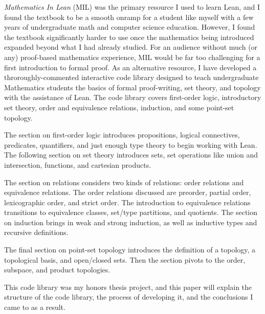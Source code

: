 \textit{Mathematics In Lean} (MIL) was the primary resource I used 
to learn Lean, and I found the textbook to be a smooth
onramp for a student like myself with a few years of undergraduate
math and computer science education. However, I found the textbook
significantly harder to use once the mathematics being introduced 
expanded beyond what I had already studied. For an audience without
much (or any) proof-based mathematics experience, MIL would be 
far too challenging for a first introduction to formal proof.
As an alternative resource, I have developed a throroughly-commented
interactive code library designed to teach undergraduate Mathematics
students the basics of formal proof-writing, set theory, and topology 
with the assistance of Lean. The code library covers first-order logic,
introductory set theory, order and equivalence relations, induction, and
some point-set topology. 

The section on first-order logic introduces propositions, 
logical connectives, predicates, quantifiers, and just enough
type theory to begin working with Lean. The following section on
set theory introduces sets, set operations like union and intersection,
functions, and cartesian products.

The section on relations considers two kinds of relations:
order relations and equivalence relations. The order relations
discussed are preorder, partial order, lexicographic order, and 
strict order. The introduction to equivalence relations transitions 
to equivalence classes, set/type partitions, and quotients. The section
on induction brings in weak and strong induction, as well as inductive
types and recursive definitions.

The final section on point-set topology introduces the definition of a 
topology, a topological basis, and open/closed sets. Then the section
pivots to the order, subspace, and product topologies.

This code library was my honors thesis project, and this paper
will explain the structure of the code library, the process of
developing it, and the conclusions I came to as a result.